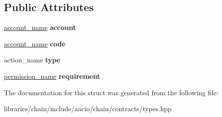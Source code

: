 \subsection*{Public Attributes}
\begin{DoxyCompactItemize}
\item 
\mbox{\label{structaacio_1_1chain_1_1contracts_1_1linkauth_a1ec6ce06307cd1b8af6053f278781bdf}} 
\mbox{\hyperlink{structaacio_1_1chain_1_1name}{account\+\_\+name}} {\bfseries account}
\item 
\mbox{\label{structaacio_1_1chain_1_1contracts_1_1linkauth_a68546b5f5f40d1b8d469bd18389c8a8b}} 
\mbox{\hyperlink{structaacio_1_1chain_1_1name}{account\+\_\+name}} {\bfseries code}
\item 
\mbox{\label{structaacio_1_1chain_1_1contracts_1_1linkauth_a42052b1d09a168da499781fc2eab14c4}} 
action\+\_\+name {\bfseries type}
\item 
\mbox{\label{structaacio_1_1chain_1_1contracts_1_1linkauth_a6f1f185dcdcb23ecd5f230cf95e51d1e}} 
\mbox{\hyperlink{structaacio_1_1chain_1_1name}{permission\+\_\+name}} {\bfseries requirement}
\end{DoxyCompactItemize}


The documentation for this struct was generated from the following file\+:\begin{DoxyCompactItemize}
\item 
libraries/chain/include/aacio/chain/contracts/types.\+hpp\end{DoxyCompactItemize}
